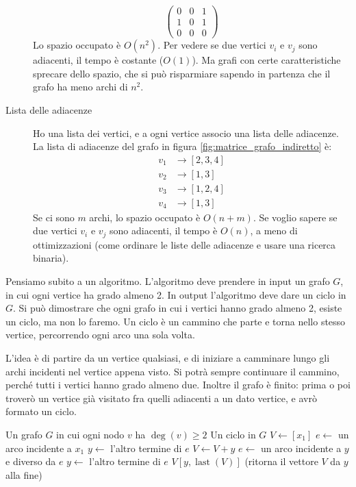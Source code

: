 \begin{description}
\begin{figure}[h]
    \end{figure}
    \[
    \begin{pmatrix}
    0 & 0 & 1 \\
    1 & 0 & 1 \\
    0 & 0 & 0
    \end{pmatrix}
    \]
    Lo spazio occupato \`e $O(n^2)$. Per vedere se due vertici $v_i$ e $v_j$ sono adiacenti, il tempo \`e costante ($O(1)$). Ma grafi con certe caratteristiche sprecare dello spazio, che si pu\`o risparmiare sapendo in partenza che il grafo ha meno archi di $n^2$.
    \item[Lista delle adiacenze] Ho una lista dei vertici, e a ogni vertice associo una lista delle adiacenze. La lista di adiacenze del grafo in figura \ref{fig:matrice_grafo_indiretto} \`e:
    \begin{align*}
    v_1 &\to [2, 3, 4] \\
    v_2 &\to [1, 3] \\
    v_3 &\to [1, 2, 4] \\
    v_4 &\to [1, 3]
    \end{align*}
    Se ci sono $m$ archi, lo spazio occupato \`e $O(n+m)$. Se voglio sapere se due vertici $v_i$ e $v_j$ sono adiacenti, il tempo \`e $O(n)$, a meno di ottimizzazioni (come ordinare le liste delle adiacenze e usare una ricerca binaria).
\end{description}

Pensiamo subito a un algoritmo. L'algoritmo deve prendere in input un grafo $G$, in cui ogni vertice ha grado almeno 2. In output l'algoritmo deve dare un ciclo in $G$. Si pu\`o dimostrare che ogni grafo in cui i vertici hanno grado almeno 2, esiste un ciclo, ma non lo faremo. Un ciclo \`e un cammino che parte e torna nello stesso vertice, percorrendo ogni arco una sola volta.

L'idea \`e di partire da un vertice qualsiasi, e di iniziare a camminare lungo gli archi incidenti nel vertice appena visto. Si potr\`a sempre continuare il cammino, perch\'e tutti i vertici hanno grado almeno due. Inoltre il grafo \`e finito: prima o poi trover\`o un vertice gi\`a visitato fra quelli adiacenti a un dato vertice, e avr\`o formato un ciclo.

\begin{algorithm}
\caption{\label{alg_ciclo_grafo_grado_due}Algoritmo per trovare un ciclo in un grafo $G$ in cui ogni nodo ha grado almeno due}
\begin{algorithmic}[1]
\Require Un grafo $G$ in cui ogni nodo $v$ ha $\deg(v) \ge 2$
\Ensure Un ciclo in $G$
\State $V \gets [x_1]$
\State $e \gets $ un arco incidente a $x_1$
\State $y \gets$ l'altro termine di $e$
    \State $V \gets V + y$
    \State $e \gets$ un arco incidente a $y$ e diverso da $e$
    \State $y \gets $ l'altro termine di $e$
\EndWhile
\State \Return $V [y, \operatorname{last}(V)]$ (ritorna il vettore $V$ da $y$ alla fine)
\end{algorithmic}
\end{algorithm}

